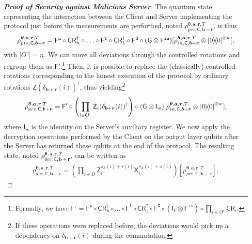 \documentclass[12pt]{iopart}
\newcommand{\cptp}[1]{\mathsf{#1}} \newcommand{\pd}[1]{\mathcal{#1}}  \newcommand{\sch}[1]{\bm{#1}}
\newcommand{\Id}{\cptp{I}}
\newcommand{\X}{\cptp{X}}
\newcommand{\Z}{\cptp{Z}}
\renewcommand{\1}{\mathds{1}}
\newcommand{\CR}{\mathsf{CR}}
\begin{document}
\begin{proof}[\bf Proof of Security against Malicious Server]
The quantum state representing the interaction between the Client and Server implementing the protocol just before the measurements are performed, noted $\rho_{pre, \cptp C, \bm{b} + \bm{r}}^{\bm{\theta},\bm{a}, \bm{r}, T}$, is thus
\begin{align}
\rho_{pre, \cptp C, \bm{b} + \bm{r}}^{\bm{\theta},\bm{a}, \bm{r}, T} = \cptp F^{\mathtt{n}}\circ\CR_n^\dagger\circ\ldots\circ\cptp F^{\mathtt{1}}\circ\CR_1^\dagger \circ\cptp F^{\mathtt{G}}\circ(\cptp G\otimes \cptp F^{\mathtt{in}})[\rho_{in, \cptp C, \bm{b} + \bm{r}}^{\bm{\theta},\bm{a}, \bm{r}, T}\otimes\dyad{0}^{\otimes w}],
\end{align}
with $|O^c| = n$.
We can move all deviations through the controlled rotations and regroup them as $\cptp F'$.\footnote{Formally, we have $\cptp F' = \cptp F^{\mathtt{n}}\circ\CR_n^\dagger\circ\ldots\circ\cptp F^{\mathtt{1}}\circ\CR_1^\dagger \circ\cptp F^{\mathtt{G}}\circ (\Id_V \otimes \cptp F^{\mathtt{in}}) \circ \prod_{i \in O^c} \CR_i$.} Then, it is possible to replace the (classically) controlled rotations corresponding to the honest execution of the protocol by ordinary rotations $\Z(\delta_{\bm{b} + \bm{r}}(i))^\dagger$, thus yielding\footnote{If these operations were replaced before, the deviations would pick up a dependency on $\delta_{\bm{b} + \bm{r}}(i)$ during the commutation.}
\begin{align}
\rho_{pre, \cptp C, \bm{b} + \bm{r}}^{\bm{\theta},\bm{a}, \bm{r}, T} = \cptp F'\circ \left(\prod_{i \in O^c}\Z_i(\delta_{\bm{b} + \bm{r}}(i))^\dagger\right) \circ (\cptp G \otimes \Id_w)[\rho_{in, \cptp C, \bm{b} + \bm{r}}^{\bm{\theta},\bm{a}, \bm{r}, T}\otimes\dyad{0}^{\otimes w}],
\end{align}
where $\Id_w$ is the identity on the Server's auxiliary register.
We now apply the decryption operations performed by the Client on the output layer qubits after the Server has returned these qubits at the end of the protocol. The resulting state, noted $\rho_{dec, \cptp C, \bm{b} + \bm{r}}^{\bm{\theta},\bm{a}, \bm{r}, T}$, can be written as
\begin{align}
\rho_{dec, \cptp C, \bm{b} + \bm{r}}^{\bm{\theta},\bm{a}, \bm{r}, T} = \left(\prod_{i \in O}\Z_i^{s_Z(i) + r(i)}\X_i^{s_X(i) + a(i)}\right) [\rho_{pre, \cptp C, \bm{b} + \bm{r}}^{\bm{\theta},\bm{a}, \bm{r}, T}],
\end{align}

\end{proof}
\end{document}
